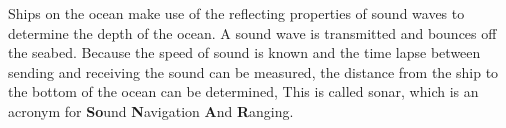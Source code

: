 \begin{minipage}{.5\textwidth}
\begin{figure}[H]
\begin{center}
\end{center}

 \end{figure}       
\end{minipage}
\begin{minipage}{.5\textwidth}
      \label{m38800*id185212}Ships on the ocean make use of the reflecting properties of sound waves to determine the depth of the ocean. A sound wave is transmitted and bounces off the seabed. Because the speed of sound is known and the time lapse between sending and receiving the sound can be measured, the distance from the ship to the bottom of the ocean can be determined, This is called sonar, which is an acronym for \textbf{So}und \textbf{N}avigation \textbf{A}nd \textbf{R}anging.\par 
      \label{m38800*uid13}
     \end{minipage}  \vspace{-1cm}
